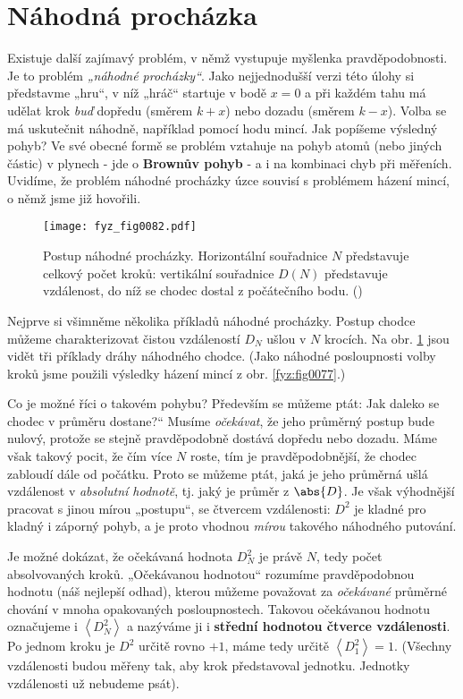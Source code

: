   \section{Náhodná procházka}
    Existuje další zajímavý problém, v němž vystupuje myšlenka pravděpodobnosti. Je to problém 
    \emph{„náhodné procházky“}. Jako nejjednodušší verzi této úlohy si představme „hru“, v níž 
    „hráč“ startuje v bodě \(x = 0\) a při každém tahu má udělat krok \emph{buď} dopředu (směrem 
    \(k + x\)) nebo dozadu (směrem \(k - x\)). Volba se má uskutečnit náhodně, například pomocí 
    hodu mincí. Jak popíšeme výsledný pohyb? Ve své obecné formě se problém vztahuje na pohyb atomů 
    (nebo jiných částic) v plynech - jde o \textbf{Brownův pohyb} - a i na kombinaci chyb při 
    měřeních. Uvidíme, že problém náhodné procházky úzce souvisí s problémem házení mincí, o němž 
    jsme již hovořili.

    \begin{figure}[ht!]  %
      \centering
      \texttt{[image: fyz\_fig0082.pdf]}
      \caption{Postup náhodné procházky. Horizontální souřadnice \(N\) představuje celkový počet 
               kroků: vertikální souřadnice \(D(N)\) představuje vzdálenost, do níž se chodec 
               dostal z počátečního bodu. (\cite[s.~83]{Feynman01})}
      \label{fyz:fig0082}
    \end{figure}
    
    Nejprve si všimněme několika příkladů náhodné procházky. Postup chodce můžeme charakterizovat 
    čistou vzdáleností \(D_N\) ušlou v \(N\) krocích. Na obr. \ref{fyz:fig0082} jsou vidět tři 
    příklady dráhy náhodného chodce. (Jako náhodné posloupnosti volby kroků jsme použili výsledky 
    házení mincí z obr. \ref{fyz:fig0077}.)
    
    Co je možné říci o takovém pohybu? Především se můžeme ptát: Jak daleko se chodec v průměru 
    dostane?“ Musíme \emph{očekávat}, že jeho průměrný postup bude nulový, protože se stejně 
    pravděpodobně dostává dopředu nebo dozadu. Máme však takový pocit, že čím více \(N\) roste, tím 
    je pravděpodobnější, že chodec zabloudí dále od počátku. Proto se můžeme ptát, jaká je jeho 
    průměrná ušlá vzdálenost v \emph{absolutní hodnotě}, tj. jaký je průměr z \(\abs{D}\). Je však 
    výhodnější pracovat s jinou mírou „postupu“, se čtvercem vzdálenosti: \(D^2\) je kladné pro 
    kladný i záporný pohyb, a je proto vhodnou \emph{mírou} takového náhodného putování.
    
    Je možné dokázat, že očekávaná hodnota \(D_N^2\) je právě \(N\), tedy počet absolvovaných 
    kroků. „Očekávanou hodnotou“ rozumíme pravděpodobnou hodnotu (náš nejlepší odhad), kterou 
    můžeme považovat za \emph{očekávané} průměrné chování v mnoha opakovaných posloupnostech. 
    Takovou očekávanou hodnotu označujeme i \(\left\langle D_N^2\right\rangle\) a nazýváme ji i 
    \textbf{střední hodnotou čtverce vzdálenosti}. Po jednom kroku je \(D^2\) určitě rovno \(+1\), 
    máme tedy určitě \(\left\langle D_1^2\right\rangle = 1\). (Všechny vzdálenosti budou měřeny 
    tak, aby krok představoval jednotku. Jednotky vzdálenosti už nebudeme psát).

